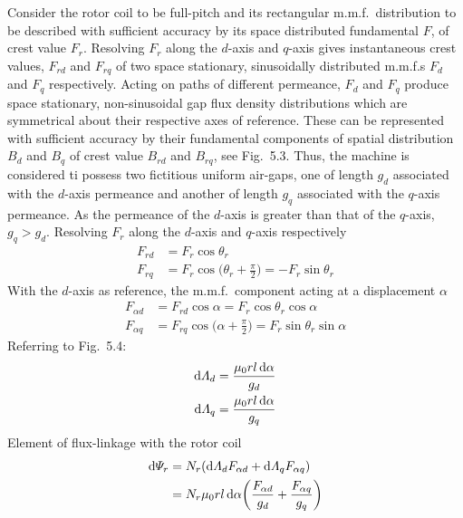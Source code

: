 \documentclass[a4paper,numbers=noenddot,12pt]{scrbook}
\begin{document}
Consider the rotor coil to be full-pitch and its rectangular m.m.f.\ distribution to be described with sufficient accuracy by its space distributed fundamental $F$, of crest value $F_r$. Resolving $F_r$ along the $d$-axis and $q$-axis gives instantaneous crest values, $F_{rd}$ and $F_{rq}$ of two space stationary, sinusoidally distributed m.m.f.s $F_d$ and $F_q$ respectively. Acting on paths of different permeance, $F_d$ and $F_q$ produce space stationary, non-sinusoidal gap flux density distributions which are symmetrical about their respective axes of reference. These can be represented with sufficient accuracy by their fundamental components of spatial distribution $B_d$ and $B_q$ of crest value $B_{rd}$ and $B_{rq}$, see Fig.\ 5.3. Thus, the machine is considered ti possess two fictitious uniform air-gaps, one of length $g_d$ associated with the $d$-axis permeance and another of length $g_q$ associated with the $q$-axis permeance. As the permeance of the $d$-axis is greater than that of the $q$-axis, $g_q>g_d$. Resolving $F_r$ along the $d$-axis and $q$-axis respectively
\begin{equation}
    \begin{aligned}
        F_{rd} & = F_r \cos \theta_r \\
        F_{rq} & = F_r \cos\bigg( \theta_r+\frac{\pi}{2} \bigg)= -F_r \sin \theta_r
    \end{aligned}
\end{equation}
With the $d$-axis as reference, the m.m.f.\ component acting at a displacement $\alpha$
\begin{equation}
    \begin{aligned}
        F_{\alpha d} & = F_{r d} \cos \alpha = F_r  \cos \theta_r \cos \alpha \\
        F_{\alpha q} & = F_{r q} \cos\bigg( \alpha + \frac{\pi}{2} \bigg)= F_r \sin \theta_r \sin \alpha 
    \end{aligned}
\end{equation}
Referring to Fig.\ 5.4:
\begin{equation}
    \begin{aligned}
        \dif \varLambda_d & = \frac{\mu_0 r l \dif \alpha}{g_d}  \\
        \dif \varLambda_q & = \frac{\mu_0 r l \dif \alpha}{g_q} 
    \end{aligned}
\end{equation}
Element of flux-linkage with the rotor coil
\begin{equation}
    \begin{aligned}
        \dif \varPsi_r & = N_r (\dif \varLambda_d F_{\alpha d} + \dif \varLambda_q F_{\alpha q}) \\
        & = N_r \mu_0 r l \dif \alpha \bigg(\frac{F_{\alpha d}}{g_d} + \frac{F_{\alpha q}}{g_q} \bigg) 
    \end{aligned}
\end{equation}
\end{document}
